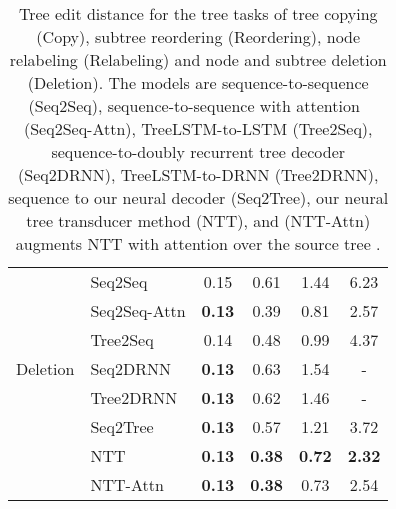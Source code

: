 \begin{table*}[tbh!]
\begin{tabular}{l l|c c c c}
         
         & Seq2Seq & 0.15 & 0.61 & 1.44 & 6.23\\
          & Seq2Seq-Attn & {\bf 0.13} & 0.39 & 0.81 & 2.57\\
         & Tree2Seq &   0.14 & 0.48 & 0.99 & 4.37  \\
         Deletion & Seq2DRNN &  {\bf 0.13} &  0.63 &  1.54 & - \\
         & Tree2DRNN &  {\bf 0.13} & 0.62 & 1.46 & - \\
         & Seq2Tree &  {\bf 0.13} & 0.57 & 1.21 & 3.72 \\
         & NTT & {\bf 0.13} & {\bf 0.38} & {\bf 0.72} & {\bf 2.32} \\
         & NTT-Attn & {\bf 0.13} & {\bf 0.38} & 0.73 &  2.54 \\ \hline
    \end{tabular}
    \caption{Tree edit distance for the tree tasks of tree copying (Copy), subtree reordering (Reordering),  node relabeling (Relabeling) and node and subtree deletion (Deletion). The models are sequence-to-sequence \citep{sutskever2014sequence} (Seq2Seq), sequence-to-sequence with attention~\citep{bahdanau2014neural} (Seq2Seq-Attn), TreeLSTM-to-LSTM (Tree2Seq), sequence-to-doubly recurrent tree decoder (Seq2DRNN), TreeLSTM-to-DRNN (Tree2DRNN), sequence to our neural decoder (Seq2Tree), our neural tree transducer method (NTT), and (NTT-Attn) augments NTT with attention over the source tree .}
    \label{tab:t2tresults}
\end{table*}